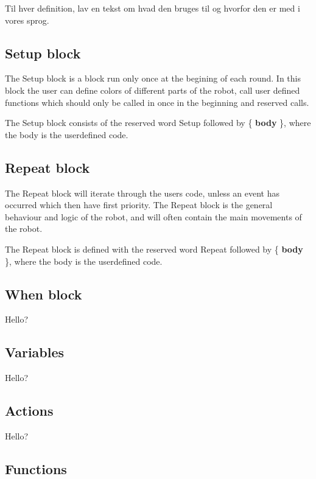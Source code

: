 Til hver definition, lav en tekst om hvad den bruges til og hvorfor den er med i vores sprog.

\subsection{Setup block}
The Setup block is a block run only once at the begining of each round. In this block the user can define colors of different parts of the robot, call user defined functions which should only be called in once in the beginning and reserved calls. 

\begin{defi}
The Setup block consists of the reserved word Setup followed by \{ \textbf{body} \}, where the body is the userdefined code. 
\end{defi}

\subsection{Repeat block}
The Repeat block will iterate through the users code, unless an event has occurred which then have first priority. The Repeat block is the general behaviour and logic of the robot, and will often contain the main movements of the robot.

\begin{defi}
The Repeat block is defined with the reserved word Repeat followed by \{ \textbf{body} \}, where the body is the userdefined code.
\end{defi}
\subsection{When block}


\begin{defi}
Hello?
\end{defi}
\subsection{Variables}


\begin{defi}
Hello?
\end{defi}
\subsection{Actions}


\begin{defi}
Hello?
\end{defi}
\subsection{Functions}


